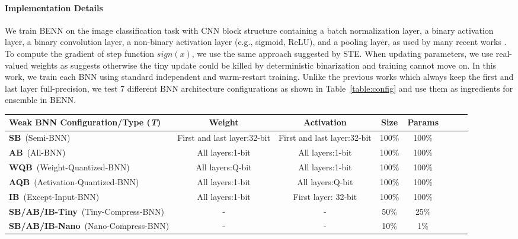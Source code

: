 \documentclass[10pt,twocolumn,letterpaper]{article}
\begin{document}
\paragraph{Implementation Details} We train BENN on the image classification task with CNN block structure containing a batch normalization layer, a binary activation layer, a binary convolution layer, a non-binary activation layer (e.g., sigmoid, ReLU), and a pooling layer, as used by many recent works \cite{rastegari2016xnor, zhou2016dorefa}. To compute the gradient of step function $sign(x)$, we use the same approach suggested by STE. When updating parameters, we use real-valued weights as \cite{rastegari2016xnor} suggests otherwise the tiny update could be killed by deterministic binarization and training cannot move on. In this work, we train each BNN using standard independent and warm-restart training. Unlike the previous works which always keep the first and last layer full-precision, we test 7 different BNN architecture configurations as shown in Table~\ref{table:config} and use them as ingredients for ensemble in BENN.
\begin{table*}
    \caption{Weak BNN Configurations Used to Ensemble (W-weights, A-activation, Params-number of parameters in network). The Last Two are Naive Compressed Network.}
    \centering
    \scriptsize
    \begin{tabular}{lccccccr}
        \toprule
        \toprule
        Weak BNN Configuration/Type (\textit{T}) & Weight & Activation & Size & Params\\
        \midrule
        \multirow{1}{4.5cm}{\textbf{SB}~(Semi-BNN)} & First and last layer:32-bit &  First and last layer:32-bit & 100\% & 100\%\\
        \hline
        \multirow{1}{4.5cm}{\textbf{AB}~(All-BNN)} & All layers:1-bit & All layers:1-bit & 100\% & 100\%\\
        \hline
        \multirow{1}{4.5cm}{\textbf{WQB}~(Weight-Quantized-BNN)} & All layers:Q-bit & All layers:1-bit & 100\% & 100\%\\
        \hline
        \multirow{1}{4.5cm}{\textbf{AQB}~(Activation-Quantized-BNN)} & All layers:1-bit & All layers:Q-bit & 100\% & 100\%\\
        \hline
        \multirow{1}{4.5cm}{\textbf{IB}~(Except-Input-BNN)} & All layers:1-bit & First layer: 32-bit & 100\% & 100\%\\
        \hline
        \multirow{1}{4.5cm}{\textbf{SB/AB/IB-Tiny}~(Tiny-Compress-BNN)} & - & - & 50\% & 25\%\\
        \hline
        \multirow{1}{4.5cm}{\textbf{{}SB/AB/IB-Nano}~(Nano-Compress-BNN)} & - & - & 10\% & 1\%\\
        \hline

        \hline
        \bottomrule
    \end{tabular}
    \label{table:config}
\end{table*}
\vspace{-5mm}
\end{document}
